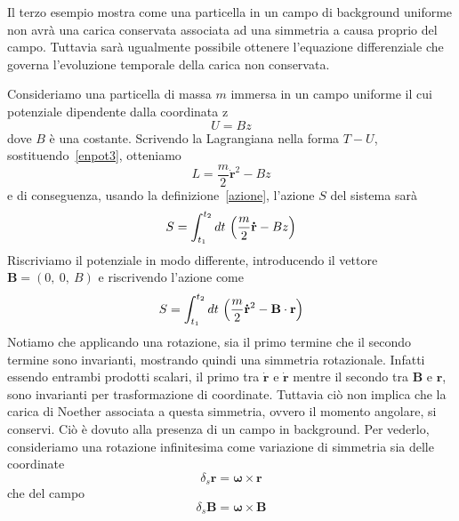     Il terzo esempio mostra come una particella in un campo di background uniforme non avrà una carica conservata associata ad una simmetria a causa proprio del campo. Tuttavia sarà ugualmente possibile ottenere l'equazione differenziale che governa l'evoluzione temporale della carica non conservata.

    \begin{example} 
        Consideriamo una particella di massa $m$ immersa in un campo uniforme il cui potenziale dipendente dalla coordinata z
    \begin{equation}\label{enpot3}
        U = B z
    \end{equation}
        dove $B$ è una costante. Scrivendo la Lagrangiana nella forma $T - U$, sostituendo~\eqref{enpot3}, otteniamo 
    \begin{equation} \label{lag3}
        L = \frac{m}{2} \mathbf{\dot r}^2 - B z
    \end{equation}
        e di conseguenza, usando la definizione~\eqref{azione}, l'azione $S$ del sistema sarà
    \begin{equation}
        S = \int_{t_1}^{t_2}dt~ \Big( \frac{m}{2} \mathbf{\dot r} - B z \Big)
    \end{equation}
        Riscriviamo il potenziale in modo differente, introducendo il vettore $\mathbf B = (0,~0,~B)$ e riscrivendo l'azione come
    \begin{equation}
        S = \int_{t_1}^{t_2}dt~ \Big( \frac{m}{2} \mathbf{\dot r}^2 - \mathbf B \cdot \mathbf r \Big)
    \end{equation}
        Notiamo che applicando una rotazione, sia il primo termine che il secondo termine sono invarianti, mostrando quindi una simmetria rotazionale. Infatti essendo entrambi prodotti scalari, il primo tra $\mathbf{\dot r}$ e $\mathbf{\dot r}$ mentre il secondo tra $\mathbf B$ e $\mathbf r$, sono invarianti per trasformazione di coordinate. Tuttavia ciò non implica che la carica di Noether associata a questa simmetria, ovvero il momento angolare, si conservi. Ciò è dovuto alla presenza di un campo in background. Per vederlo, consideriamo una rotazione infinitesima come variazione di simmetria sia delle coordinate 
    \begin{equation}
        \delta_s \mathbf r = \boldsymbol \omega \times \mathbf r
    \end{equation}
        che del campo
    \begin{equation}
        \delta_s \mathbf B = \boldsymbol \omega \times \mathbf B

\end{equation}
\end{example}
